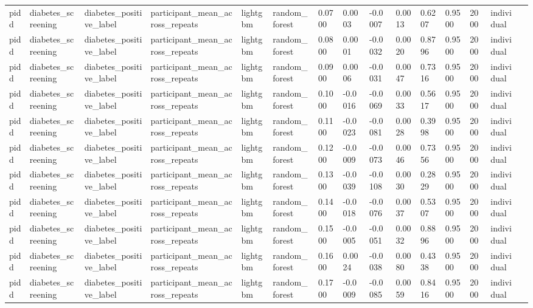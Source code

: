 \begin{tabular}{lllllllllllllll}
pidd & diabetes\_screening & diabetes\_positive\_label & participant\_mean\_across\_repeats & lightgbm & random\_forest & 0.0700 & 0.0003 & -0.0007 & 0.0013 & 0.6207 & 0.9500 & 2000 & individual &  \\
pidd & diabetes\_screening & diabetes\_positive\_label & participant\_mean\_across\_repeats & lightgbm & random\_forest & 0.0800 & 0.0001 & -0.0032 & 0.0020 & 0.8796 & 0.9500 & 2000 & individual &  \\
pidd & diabetes\_screening & diabetes\_positive\_label & participant\_mean\_across\_repeats & lightgbm & random\_forest & 0.0900 & 0.0006 & -0.0031 & 0.0047 & 0.7316 & 0.9500 & 2000 & individual &  \\
pidd & diabetes\_screening & diabetes\_positive\_label & participant\_mean\_across\_repeats & lightgbm & random\_forest & 0.1000 & -0.0016 & -0.0069 & 0.0033 & 0.5617 & 0.9500 & 2000 & individual &  \\
pidd & diabetes\_screening & diabetes\_positive\_label & participant\_mean\_across\_repeats & lightgbm & random\_forest & 0.1100 & -0.0023 & -0.0081 & 0.0028 & 0.3998 & 0.9500 & 2000 & individual &  \\
pidd & diabetes\_screening & diabetes\_positive\_label & participant\_mean\_across\_repeats & lightgbm & random\_forest & 0.1200 & -0.0009 & -0.0073 & 0.0046 & 0.7356 & 0.9500 & 2000 & individual &  \\
pidd & diabetes\_screening & diabetes\_positive\_label & participant\_mean\_across\_repeats & lightgbm & random\_forest & 0.1300 & -0.0039 & -0.0108 & 0.0030 & 0.2829 & 0.9500 & 2000 & individual &  \\
pidd & diabetes\_screening & diabetes\_positive\_label & participant\_mean\_across\_repeats & lightgbm & random\_forest & 0.1400 & -0.0018 & -0.0076 & 0.0037 & 0.5307 & 0.9500 & 2000 & individual &  \\
pidd & diabetes\_screening & diabetes\_positive\_label & participant\_mean\_across\_repeats & lightgbm & random\_forest & 0.1500 & -0.0005 & -0.0051 & 0.0032 & 0.8896 & 0.9500 & 2000 & individual &  \\
pidd & diabetes\_screening & diabetes\_positive\_label & participant\_mean\_across\_repeats & lightgbm & random\_forest & 0.1600 & 0.0024 & -0.0038 & 0.0080 & 0.4338 & 0.9500 & 2000 & individual &  \\
pidd & diabetes\_screening & diabetes\_positive\_label & participant\_mean\_across\_repeats & lightgbm & random\_forest & 0.1700 & -0.0009 & -0.0085 & 0.0059 & 0.8416 & 0.9500 & 2000 & individual &  \\

\end{tabular}
